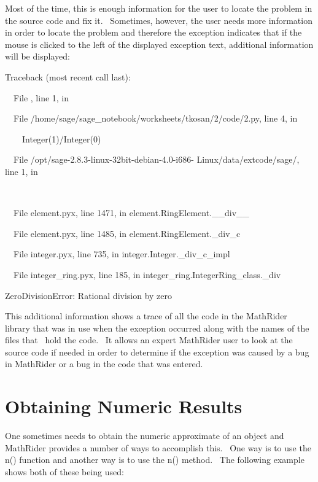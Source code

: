 \documentclass[12pt,twoside]{book}
\begin{document}
\bigskip

Most of the time, this is enough information for the user to locate the problem in the source code and fix it. \ Sometimes, however, the user needs more information in order to locate the problem and therefore the exception indicates that if the mouse is clicked to the left of the displayed exception text, additional information will be displayed: 

\bigskip

Traceback (most recent call last):

\ \ File {\textquotedbl}{\textquotedbl}, line 1, in 

\ \ File
{\textquotedbl}/home/sage/sage\_notebook/worksheets/tkosan/2/code/2.py{\textquotedbl},  line 4, in 

\ \ \ \ Integer(1)/Integer(0)

\ \ File {\textquotedbl}/opt/sage{}-2.8.3{}-linux{}-32bit{}-debian{}-4.0{}-i686{}- Linux/data/extcode/sage/{\textquotedbl}, line 1, in 

\ \ \ \ 

\ \ File {\textquotedbl}element.pyx{\textquotedbl}, line 1471, in element.RingElement.\_\_div\_\_

\ \ File {\textquotedbl}element.pyx{\textquotedbl}, line 1485, in element.RingElement.\_div\_c

\ \ File {\textquotedbl}integer.pyx{\textquotedbl}, line 735, in integer.Integer.\_div\_c\_impl

\ \ File {\textquotedbl}integer\_ring.pyx{\textquotedbl}, line 185, in integer\_ring.IntegerRing\_class.\_div

ZeroDivisionError: Rational division by zero

This additional information shows a trace of all the code in the MathRider library that was in use when the exception occurred along with the names of the files that \ hold the code. \ It allows an expert MathRider user to look at the source code if needed in order to determine if the exception was caused by a bug in MathRider or a bug in the code that was entered.

\section[Obtaining Numeric Results]{Obtaining Numeric Results}

One sometimes needs to obtain the numeric approximate of an object and MathRider provides a number of ways to accomplish this. \ One way is to use the n() function and another way is to use the n() method. \ The following example shows both of these being used: 
\end{document}
